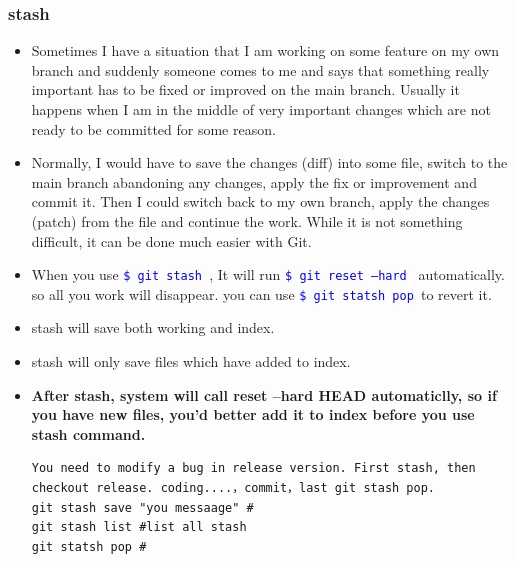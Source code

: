 \documentclass[a4paper,12pt,twoside]{book}
\newcommand{\linuxcommand}[1]{\texttt{\textcolor{blue}{\$ #1 \Pisymbol{psy}{191}}}}
\begin{document}
\subsubsection{stash}
\begin{itemize}
		\item Sometimes I have a situation that I am working on some feature on my own branch and suddenly someone comes to me and says that something really important has to be fixed or improved on the main branch. Usually it happens when I am in the middle of very important changes which are not ready to be committed for some reason. 

\item Normally, I would have to save the changes (diff) into some file, switch to the main branch abandoning any changes, apply the fix or improvement and commit it. Then I could switch back to my own branch, apply the changes (patch) from the file and continue the work. While it is not something difficult, it can be done much easier with Git.

\item When you use \linuxcommand{git stash}, It will run \linuxcommand{git reset --hard} automatically. so all you work will disappear. you can use \linuxcommand{git statsh pop }to revert it.
\item stash will save both working and index.
\item stash will only save files which have added to index.
\item \textbf{After stash, system will call reset --hard HEAD automaticlly, so if you have new files, you'd better add it to index before you use stash command.}
\begin{verbatim}
You need to modify a bug in release version. First stash, then checkout release. coding....，commit，last git stash pop.
git stash save "you messaage" #
git stash list #list all stash
git statsh pop #
\end{verbatim}

\end{itemize}
\end{document}
